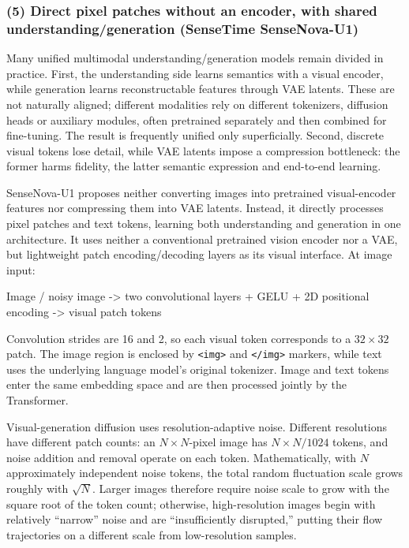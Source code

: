 \hypertarget{direct-pixel-patches-without-an-encoder-with-shared-understandinggeneration-sensetime-sensenova-u1}{%
\subsubsection{(5) Direct pixel patches without an encoder, with shared understanding/generation (SenseTime SenseNova-U1)}\label{direct-pixel-patches-without-an-encoder-with-shared-understandinggeneration-sensetime-sensenova-u1}}

Many unified multimodal understanding/generation models remain divided in practice. First, the understanding side learns semantics with a visual encoder, while generation learns reconstructable features through VAE latents. These are not naturally aligned; different modalities rely on different tokenizers, diffusion heads or auxiliary modules, often pretrained separately and then combined for fine-tuning. The result is frequently unified only superficially. Second, discrete visual tokens lose detail, while VAE latents impose a compression bottleneck: the former harms fidelity, the latter semantic expression and end-to-end learning.

SenseNova-U1 proposes neither converting images into pretrained visual-encoder features nor compressing them into VAE latents. Instead, it directly processes pixel patches and text tokens, learning both understanding and generation in one architecture. It uses neither a conventional pretrained vision encoder nor a VAE, but lightweight patch encoding/decoding layers as its visual interface. At image input:

Image / noisy image -\textgreater{} two convolutional layers + GELU + 2D positional encoding -\textgreater{} visual patch tokens

Convolution strides are 16 and 2, so each visual token corresponds to a \(32\times32\) patch. The image region is enclosed by \texttt{\textless{}img\textgreater{}} and \texttt{\textless{}/img\textgreater{}} markers, while text uses the underlying language model's original tokenizer. Image and text tokens enter the same embedding space and are then processed jointly by the Transformer.

Visual-generation diffusion uses resolution-adaptive noise. Different resolutions have different patch counts: an \(N\times N\)-pixel image has \(N\times N/1024\) tokens, and noise addition and removal operate on each token. Mathematically, with \(N\) approximately independent noise tokens, the total random fluctuation scale grows roughly with \(\sqrt{N}\). Larger images therefore require noise scale to grow with the square root of the token count; otherwise, high-resolution images begin with relatively ``narrow'' noise and are ``insufficiently disrupted,'' putting their flow trajectories on a different scale from low-resolution samples.

